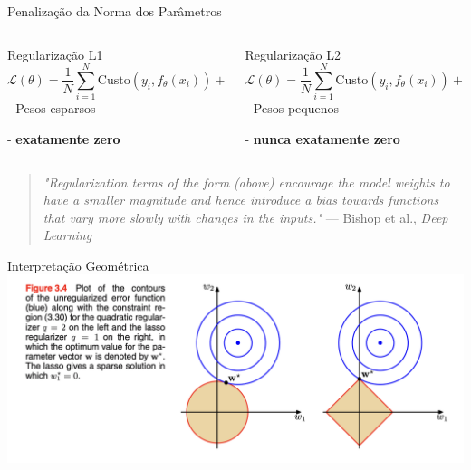 \documentclass{beamer}
\begin{document}
\begin{frame}{Penalização da Norma dos Parâmetros}
\begin{columns}[T]
\begin{column}{0.5\textwidth}
\begin{block}{Regularização L1}
\vspace{0.3cm}
{\tiny
$$\mathcal{L}(\theta) = \frac{1}{N}\sum_{i=1}^{N}\text{Custo}(y_i, f_\theta(x_i)) + \lambda||\theta||_1$$
}
\vspace{0.5cm}
- Pesos esparsos

- \textbf{exatamente zero}
\vspace{0.3cm}
\end{block}
\end{column}

\begin{column}{0.48\textwidth}
\begin{block}{Regularização L2}
\vspace{0.3cm}
{\tiny
$$\mathcal{L}(\theta) = \frac{1}{N}\sum_{i=1}^{N}\text{Custo}(y_i, f_\theta(x_i)) + \lambda||\theta||_2^2$$
}
\vspace{0.5cm}
- Pesos pequenos

- \textbf{nunca exatamente zero}
\vspace{0.3cm}
\end{block}
\end{column}
\end{columns}
\tiny{\begin{quote}
    \textit{"Regularization terms of the form (above) encourage the model weights to have a smaller magnitude and hence introduce a bias towards functions that vary more slowly with changes in the inputs."} --- Bishop et al., \textit{Deep Learning}
\end{quote}}
\end{frame}


\begin{frame}{Interpretação Geométrica}
\centering
\includegraphics[width=\textwidth,height=0.8\textheight,keepaspectratio]{imgs/bishop_example/7.png}
\end{frame}
\end{document}
